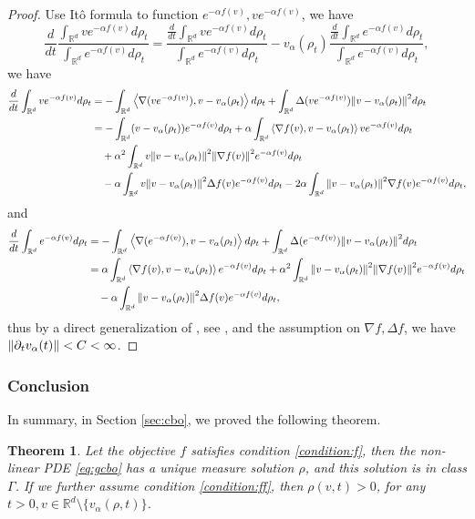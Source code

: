 \documentclass[a4paper, 11pt]{article}
\newcommand{\inner}[2]{\left< #1 , #2 \right>}
\newcounter{results}[section]
\theoremstyle{plain}
\newtheorem{theorem}[results]{Theorem}
\theoremstyle{remark}
\theoremstyle{definition}
\newcommand{\intd}{\int_{\mathbb{R}^d}}
\begin{document}
\begin{proof}
Use It\^o formula to function $e^{-\alpha f(v)},ve^{-\alpha f(v)}$, we have 
\begin{equation}
    \frac{d}{dt}\frac{\intd ve^{-\alpha f(v)}d\rho_t}{\intd e^{-\alpha f(v)}d\rho_t}=\frac{\frac{d}{dt}\intd ve^{-\alpha f(v)}d\rho_t}{\intd e^{-\alpha f(v)}d\rho_t}-v_{\alpha}(\rho_t)\frac{\frac{d}{dt}\intd e^{-\alpha f(v)}d\rho_t}{\intd e^{-\alpha f(v)}d\rho_t},
\end{equation}
we have
\begin{equation}
    \begin{aligned}
        \frac{d}{dt}\intd ve^{-\alpha f(v)}d\rho_t&=-\intd \inner{\nabla(ve^{-\alpha f(v)})}{v-v_{\alpha}(\rho_t)}d\rho_t+\intd\Delta(ve^{-\alpha f(v)})\norm{v-v_{\alpha}(\rho_t)}^2d\rho_t\\
        &=-\intd (v-v_{\alpha}(\rho_t))e^{-\alpha f(v)}d\rho_t+\alpha\intd\inner{\nabla f(v)}{v-v_{\alpha}(\rho_t)}ve^{-\alpha f(v)}d\rho_t\\
        &\quad+\alpha^2\intd v\norm{v-v_{\alpha}(\rho_t)}^2\norm{\nabla f(v)}^2e^{-\alpha f(v)}d\rho_t\\
        &\quad-\alpha\intd v\norm{v-v_{\alpha}(\rho_t)}^2\Delta f(v)e^{-\alpha f(v)}d\rho_t-2\alpha\intd \norm{v-v_{\alpha}(\rho_t)}^2\nabla f(v)e^{-\alpha f(v)}d\rho_t,
    \end{aligned}
\end{equation}
and
\begin{equation}
    \begin{aligned}
        \frac{d}{dt}\intd e^{-\alpha f(v)}d\rho_t&=-\intd \inner{\nabla(e^{-\alpha f(v)})}{v-v_{\alpha}(\rho_t)}d\rho_t+\intd\Delta(e^{-\alpha f(v)})\norm{v-v_{\alpha}(\rho_t)}^2d\rho_t\\
        &=\alpha\intd\inner{\nabla f(v)}{v-v_{\alpha}(\rho_t)}e^{-\alpha f(v)}d\rho_t+\alpha^2\intd\norm{v-v_{\alpha}(\rho_t)}^2\norm{\nabla f(v)}^2e^{-\alpha f(v)}d\rho_t\\
        &\quad -\alpha\intd\norm{v-v_{\alpha}(\rho_t)}^2\Delta f(v)e^{-\alpha f(v)}d\rho_t,
    \end{aligned}
\end{equation}
thus by a direct generalization of \cite[Lemma 3.3]{carrillo2018analytical}, see \cite[Theorem 2.3, Proposition A.3]{gerber2023propagation}, and the assumption on $\nabla f,\Delta f$, we have $\norm{\partial_tv_{\alpha}(t)}<C<\infty$.
\end{proof}
\subsubsection{Conclusion}
In summary, in Section \ref{sec:cbo}, we proved the following theorem.
\begin{theorem}\label{thm:positivity}
    Let the objective $f$ satisfies condition \eqref{condition:f}, then the non-linear PDE \eqref{eq:gcbo} has a unique measure solution $\rho$, and this solution is in class $\Gamma$. If we further assume condition \eqref{condition:ff}, then $\rho(v,t)>0$, for any $t>0,v\in\mathbb{R}^d\setminus \{v_\alpha(\rho,t)\}$.
\end{theorem}
\end{document}
